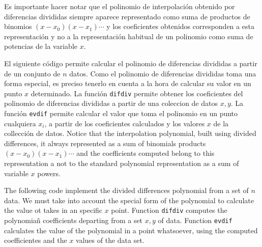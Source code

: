 \begin{paracol}{2}
Es importante hacer notar que el polinomio de interpolación obtenido por diferencias divididas siempre aparece representado como suma de productos de binomios $(x-x_0)(x-x_1)\cdots$ y los coeficientes obtenidos corresponden a esta representación y no a la representación habitual de un polinomio como suma de potencias de la variable $x$. 

El siguiente código permite calcular el polinomio de diferencias divididas a partir de un conjunto de $n$ datos. Como el polinomio de diferencias divididas toma una forma especial, es preciso tenerlo en cuenta a la hora de calcular su valor en un punto $x$ determinado. La función \texttt{difdiv} permite obtener los coeficientes del polinomio de diferencias divididas a partir de una coleccion de datos $x,y$. La función \texttt{evdif} permite calcular el valor que toma el polinomio en un punto cualquiera $x_i$, a partir de los coeficientes calculados y los valores $x$ de la collección de datos.
\switchcolumn
Notice that the interpolation polynomial, built using divided differences, it always represented as a sum of binomials products $(x-x_0)(x-x_1)\cdots$ and the coefficients computed belong to this representation a not to the standard polynomial representation as a sum of variable $x$ powers.

The following code implement the divided differences polynomial from a set of $n$ data. We must take into account the special form of the polynomial to calculate the value ot takes in an specific $x$ point. Function \texttt{difdiv} computes the polynomiañ coefficients departing from a set $x,y$ of data. Function \texttt{evdif} calculates the value of the polynomial in a point whatsoever, using the computed coefficientes and the $x$ values of the data set.  
\end{paracol}

